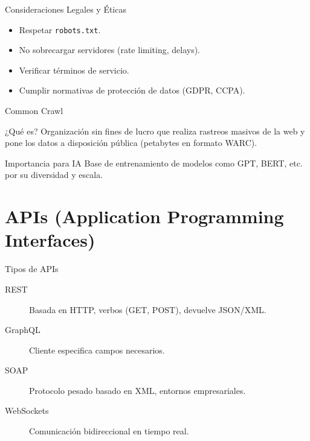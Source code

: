 \documentclass[aspectratio=169, 10pt, xcolor=table]{beamer}
\begin{document}
\begin{frame}{Consideraciones Legales y Éticas}
    \begin{itemize}
        \item Respetar \texttt{robots.txt}.
        \item No sobrecargar servidores (rate limiting, delays).
        \item Verificar términos de servicio.
        \item Cumplir normativas de protección de datos (GDPR, CCPA).
    \end{itemize}
\end{frame}

\begin{frame}{Common Crawl}
    \begin{block}{¿Qué es?}
        Organización sin fines de lucro que realiza rastreos masivos de la web y pone los datos a disposición pública (petabytes en formato WARC).
    \end{block}
    \begin{alertblock}{Importancia para IA}
        Base de entrenamiento de modelos como GPT, BERT, etc. por su diversidad y escala.
    \end{alertblock}
\end{frame}

\section{APIs (Application Programming Interfaces)}

\begin{frame}{Tipos de APIs}
    \begin{description}
        \item[REST] Basada en HTTP, verbos (GET, POST), devuelve JSON/XML.
        \item[GraphQL] Cliente especifica campos necesarios.
        \item[SOAP] Protocolo pesado basado en XML, entornos empresariales.
        \item[WebSockets] Comunicación bidireccional en tiempo real.
    \end{description}
\end{frame}
\end{document}

